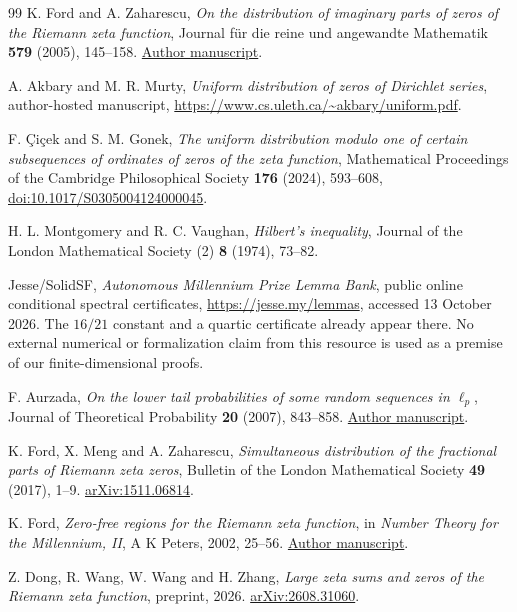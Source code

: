\documentclass[11pt,letterpaper]{article}
\theoremstyle{definition}
\theoremstyle{remark}
\newcommand{\1}{\mathbf 1}
\begin{document}
\begin{thebibliography}{99}
K. Ford and A. Zaharescu,
\emph{On the distribution of imaginary parts of zeros of the
Riemann zeta function}, Journal f\"ur die reine und angewandte
Mathematik \textbf{579} (2005), 145--158.
\href{https://ford126.web.illinois.edu/wwwpapers/fz.pdf}{Author manuscript}.


A. Akbary and M. R. Murty,
\emph{Uniform distribution of zeros of Dirichlet series},
author-hosted manuscript,
\url{https://www.cs.uleth.ca/~akbary/uniform.pdf}.


F. \c{C}i\c{c}ek and S. M. Gonek,
\emph{The uniform distribution modulo one of certain subsequences
of ordinates of zeros of the zeta function}, Mathematical Proceedings
of the Cambridge Philosophical Society \textbf{176} (2024), 593--608,
\href{https://doi.org/10.1017/S0305004124000045}{doi:10.1017/S0305004124000045}.


H. L. Montgomery and R. C. Vaughan,
\emph{Hilbert's inequality}, Journal of the London Mathematical
Society (2) \textbf{8} (1974), 73--82.


Jesse/SolidSF,
\emph{Autonomous Millennium Prize Lemma Bank}, public online
conditional spectral certificates,
\url{https://jesse.my/lemmas}, accessed 13 October 2026.
The $16/21$ constant and a quartic certificate already appear there.
No external numerical or formalization claim from this resource is
used as a premise of our finite-dimensional proofs.


F. Aurzada, \emph{On the lower tail probabilities of some random
sequences in $\ell_p$}, Journal of Theoretical Probability
\textbf{20} (2007), 843--858.
\href{https://www2.mathematik.tu-darmstadt.de/~aurzada/independent.pdf}{Author manuscript}.


K. Ford, X. Meng and A. Zaharescu, \emph{Simultaneous distribution
of the fractional parts of Riemann zeta zeros}, Bulletin of the
London Mathematical Society \textbf{49} (2017), 1--9.
\href{https://arxiv.org/abs/1511.06814}{arXiv:1511.06814}.


K. Ford, \emph{Zero-free regions for the Riemann zeta function},
in \emph{Number Theory for the Millennium, II}, A K Peters,
2002, 25--56.
\href{https://ford126.web.illinois.edu/wwwpapers/zeros.pdf}{Author manuscript}.


Z. Dong, R. Wang, W. Wang and H. Zhang,
\emph{Large zeta sums and zeros of the Riemann zeta function},
preprint, 2026.
\href{https://arxiv.org/abs/2608.31060}{arXiv:2608.31060}.



\end{thebibliography}
\end{document}
